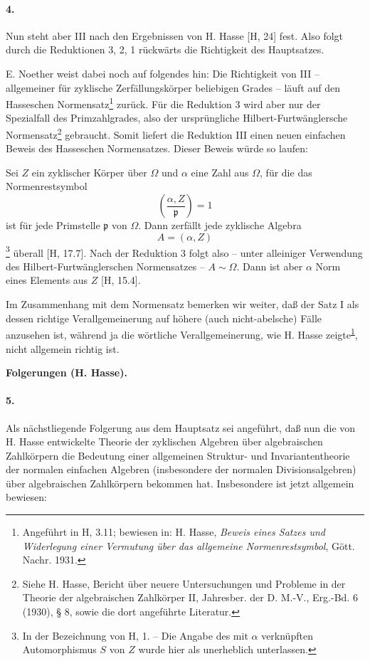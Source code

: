\paragraph{4.}
Nun steht aber III nach den Ergebnissen von H. Hasse [H, 24] fest. Also folgt durch die Reduktionen 3, 2, 1 rückwärts die Richtigkeit des Hauptsatzes.

E. Noether weist dabei noch auf folgendes hin:
Die Richtigkeit von III -- allgemeiner für zyklische Zerfällungskörper beliebigen Grades -- läuft auf den Hasseschen Normensatz\footnote{\label{fn:p38-hasse-normensatz}Angeführt in H, 3.11; bewiesen in: H. Hasse, \emph{Beweis eines Satzes und Widerlegung einer Vermutung über das allgemeine Normenrestsymbol}, Gött. Nachr. 1931.} zurück. Für die Reduktion 3 wird aber nur der Spezialfall des Primzahlgrades, also der ursprüngliche Hilbert-Furtwänglersche Normensatz\footnote{Siehe H. Hasse, Bericht über neuere Untersuchungen und Probleme in der Theorie der algebraischen Zahlkörper II, Jahresber. der D. M.-V., Erg.-Bd. 6 (1930), § 8, sowie die dort angeführte Literatur.} gebraucht. Somit liefert die Reduktion III einen neuen einfachen Beweis des Hasseschen Normensatzes. Dieser Beweis würde so laufen:

Sei \(Z\) ein zyklischer Körper über \(\Omega\) und \(\alpha\) eine Zahl aus \(\Omega\), für die das Normenrestsymbol
\[
\left(\frac{\alpha,Z}{\mathfrak p}\right)=1
\]
ist für jede Primstelle \(\mathfrak p\) von \(\Omega\). Dann zerfällt jede zyklische Algebra
\[
A=(\alpha,Z)
\]
\footnote{\label{fn:p38-hasse-notation}In der Bezeichnung von H, 1. -- Die Angabe des mit \(\alpha\) verknüpften Automorphismus \(S\) von \(Z\) wurde hier als unerheblich unterlassen.} überall [H, 17.7]. Nach der Reduktion 3 folgt also -- unter alleiniger Verwendung des Hilbert-Furtwänglerschen Normensatzes -- \(A\sim\Omega\). Dann ist aber \(\alpha\) Norm eines Elements aus \(Z\) [H, 15.4].

Im Zusammenhang mit dem Normensatz bemerken wir weiter, daß der Satz I als dessen richtige Verallgemeinerung auf höhere (auch nicht-abelsche) Fälle anzusehen ist, während ja die wörtliche Verallgemeinerung, wie H. Hasse zeigte\textsuperscript{\ref{fn:p38-hasse-normensatz}}, nicht allgemein richtig ist.

\begin{center}
\textbf{Folgerungen (H. Hasse).}
\end{center}

\paragraph{5.}
Als nächstliegende Folgerung aus dem Hauptsatz sei angeführt, daß nun die von H. Hasse entwickelte Theorie der zyklischen Algebren über algebraischen Zahlkörpern die Bedeutung einer allgemeinen Struktur- und Invariantentheorie der normalen einfachen Algebren (insbesondere der normalen Divisionsalgebren) über algebraischen Zahlkörpern bekommen hat. Insbesondere ist jetzt allgemein bewiesen:

